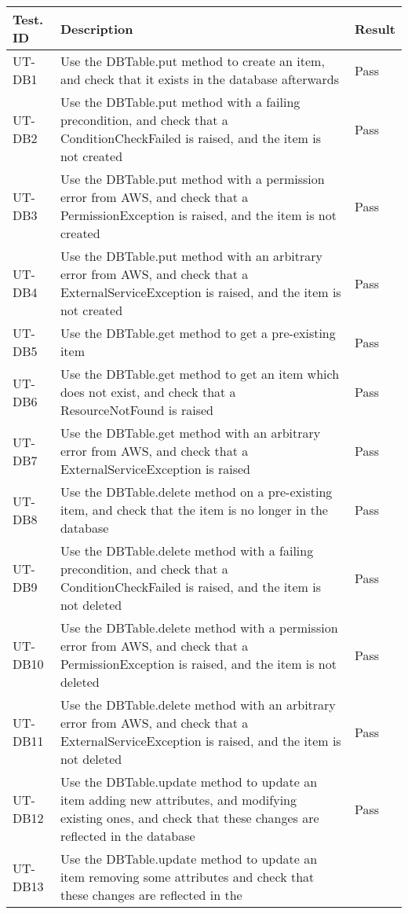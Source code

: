 \documentclass[12pt, titlepage]{article}
\begin{document}
\begin{longtable}{|m{2cm}|m{10cm}|m{1.4cm}|}
  \hline
  \textbf{Test. ID} & \textbf{Description} & \textbf{Result} \\ \hline
  UT-DB1 & Use the DBTable.put method to create an item, and check
  that it exists in the database afterwards & Pass\\ \hline
  UT-DB2 & Use the DBTable.put method with a failing precondition,
  and check that a ConditionCheckFailed is raised, and the item is
  not created & Pass\\ \hline
  UT-DB3 & Use the DBTable.put method with a permission error from
  AWS, and check that a PermissionException is raised, and the item
  is not created & Pass\\ \hline
  UT-DB4 & Use the DBTable.put method with an arbitrary error from
  AWS, and check that a ExternalServiceException is raised, and the
  item is not created & Pass\\ \hline
  UT-DB5 & Use the DBTable.get method to get a pre-existing item &
  Pass\\ \hline
  UT-DB6 & Use the DBTable.get method to get an item which does not
  exist, and check that a ResourceNotFound is raised & Pass\\ \hline
  UT-DB7 & Use the DBTable.get method with an arbitrary error from
  AWS, and check that a ExternalServiceException is raised & Pass\\ \hline
  UT-DB8 & Use the DBTable.delete method on a pre-existing item, and
  check that the item is no longer in the database & Pass\\ \hline
  UT-DB9 & Use the DBTable.delete method with a failing
  precondition, and check that a ConditionCheckFailed is raised, and
  the item is not deleted & Pass\\ \hline
  UT-DB10 & Use the DBTable.delete method with a permission error
  from AWS, and check that a PermissionException is raised, and the
  item is not deleted & Pass\\ \hline
  UT-DB11 & Use the DBTable.delete method with an arbitrary error
  from AWS, and check that a ExternalServiceException is raised, and
  the item is not deleted & Pass\\ \hline
  UT-DB12 & Use the DBTable.update method to update an item adding
  new attributes, and modifying existing ones, and check that these
  changes are reflected in the database & Pass\\ \hline
  UT-DB13 & Use the DBTable.update method to update an item removing
  some attributes and check that these changes are reflected in the

\end{longtable}
\end{document}
